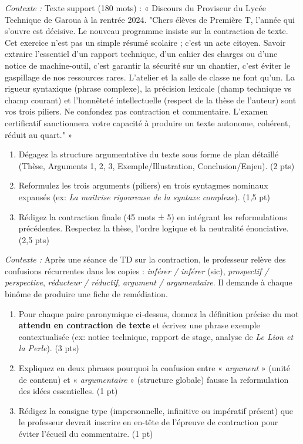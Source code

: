 \documentclass[11pt]{article}
\begin{document}
\begin{exercice}
    \textit{Contexte :} Texte support (180 mots) : « Discours du Proviseur du Lycée Technique de Garoua à la rentrée 2024. "Chers élèves de Première T, l'année qui s'ouvre est décisive. Le nouveau programme insiste sur la contraction de texte. Cet exercice n'est pas un simple résumé scolaire ; c'est un acte citoyen. Savoir extraire l'essentiel d'un rapport technique, d'un cahier des charges ou d'une notice de machine-outil, c'est garantir la sécurité sur un chantier, c'est éviter le gaspillage de nos ressources rares. L'atelier et la salle de classe ne font qu'un. La rigueur syntaxique (phrase complexe), la précision lexicale (champ technique vs champ courant) et l'honnêteté intellectuelle (respect de la thèse de l'auteur) sont vos trois piliers. Ne confondez pas contraction et commentaire. L'examen certificatif sanctionnera votre capacité à produire un texte autonome, cohérent, réduit au quart." »
    \begin{enumerate}
        \item Dégagez la structure argumentative du texte sous forme de plan détaillé (Thèse, Arguments 1, 2, 3, Exemple/Illustration, Conclusion/Enjeu). (2 pts)
        \item Reformulez les trois arguments (piliers) en trois syntagmes nominaux expansés (ex: \textit{La maîtrise rigoureuse de la syntaxe complexe}). (1,5 pt)
        \item Rédigez la contraction finale (45 mots ± 5) en intégrant les reformulations précédentes. Respectez la thèse, l'ordre logique et la neutralité énonciative. (2,5 pts)
    \end{enumerate}
\end{exercice}

\begin{exercice}
    \textit{Contexte :} Après une séance de TD sur la contraction, le professeur relève des confusions récurrentes dans les copies : \textit{inférer / inférer} (sic), \textit{prospectif / perspective}, \textit{réducteur / réductif}, \textit{argument / argumentaire}. Il demande à chaque binôme de produire une fiche de remédiation.
    \begin{enumerate}
        \item Pour chaque paire paronymique ci-dessus, donnez la définition précise du mot \textbf{attendu en contraction de texte} et écrivez une phrase exemple contextualisée (ex: notice technique, rapport de stage, analyse de \textit{Le Lion et la Perle}). (3 pts)
        \item Expliquez en deux phrases pourquoi la confusion entre « \textit{argument} » (unité de contenu) et « \textit{argumentaire} » (structure globale) fausse la reformulation des idées essentielles. (1 pt)
        \item Rédigez la consigne type (impersonnelle, infinitive ou impératif présent) que le professeur devrait inscrire en en-tête de l'épreuve de contraction pour éviter l'écueil du commentaire. (1 pt)
    \end{enumerate}
\end{exercice}
\end{document}
